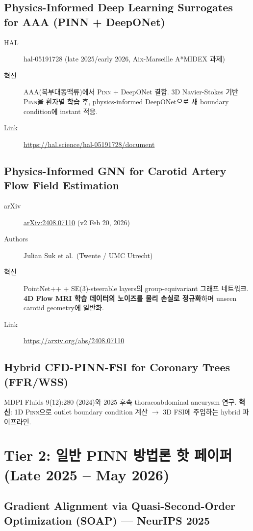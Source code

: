 \documentclass[11pt,a4paper,oneside]{report}
\newcommand{\pinn}{\textsc{Pinn}}
\newcommand{\arxivid}[1]{\href{https://arxiv.org/abs/#1}{arXiv:#1}}
\begin{document}
\subsection{Physics-Informed Deep Learning Surrogates for AAA (PINN + DeepONet)}

\begin{description}
\item[HAL] hal-05191728 (late 2025/early 2026, Aix-Marseille A*MIDEX 과제)
\item[혁신] AAA(복부대동맥류)에서 \pinn{} + DeepONet 결합. 3D Navier-Stokes 기반 \pinn{}을 환자별 학습 후, physics-informed DeepONet으로 새 boundary condition에 instant 적응.
\item[Link] \url{https://hal.science/hal-05191728/document}
\end{description}

\subsection{Physics-Informed GNN for Carotid Artery Flow Field Estimation}

\begin{description}
\item[arXiv] \arxivid{2408.07110} (v2 Feb 20, 2026)
\item[Authors] Julian Suk et al.\ (Twente / UMC Utrecht)
\item[혁신] PointNet++ + SE(3)-steerable layers의 group-equivariant 그래프 네트워크. \textbf{4D Flow MRI 학습 데이터의 노이즈를 물리 손실로 정규화}하며 unseen carotid geometry에 일반화.
\item[Link] \url{https://arxiv.org/abs/2408.07110}
\end{description}

\subsection{Hybrid CFD-PINN-FSI for Coronary Trees (FFR/WSS)}

MDPI Fluids 9(12):280 (2024)와 2025 후속 thoracoabdominal aneurysm 연구. \textbf{혁신}: 1D \pinn{}으로 outlet boundary condition 계산 $\rightarrow$ 3D FSI에 주입하는 hybrid 파이프라인.

\section{Tier 2: 일반 PINN 방법론 핫 페이퍼 (Late 2025 -- May 2026)}

\subsection{Gradient Alignment via Quasi-Second-Order Optimization (SOAP) --- NeurIPS 2025}
\end{document}
